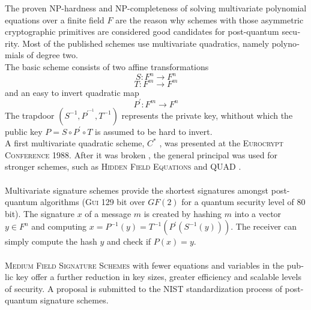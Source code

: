 \documentclass[a4paper,11pt]{article}
\begin{document}
\begin{otherlanguage}{english}
\begin{multicols}{2}
\noindent
The proven NP-hardness and NP-completeness of solving multivariate polynomial equations over a finite field $F$ are the reason why schemes with those asymmetric cryptographic primitives are considered good candidates for post-quantum security. Most of the published schemes use multivariate quadratics, namely polynomials of degree two. \\
The basic scheme consists of two affine transformations 
$$S: F^n \rightarrow F^n$$
$$T: F^m \rightarrow F^m$$
and an easy to invert quadratic map 
$$P^{\prime} : F^m \rightarrow F^n$$ 
\noindent
The trapdoor $(S^{-1}, P^{\prime^{-1}}, T^{-1})$ represents the private key, whithout which the public key $P = S \circ P^{\prime} \circ T$ is assumed to be hard to invert.\\ 
A first multivariate quadratic scheme, $C^*$ \cite{MI}, was presented at the \textsc{Eurocrypt Conference} 1988. After it was broken \cite{P95}, the general principal was used for stronger schemes, such as \textsc{Hidden Field Equations} \cite{HFE} and \textsc{QUAD} \cite{BGP}. \\
\\
Multivariate signature schemes provide the shortest signatures amongst post-quantum algorithms (\textsc{Gui} \cite{GUI} 129 bit over $GF(2)$ for a quantum security level of 80 bit). The signature $x$ of a message $m$ is created by hashing $m$ into a vector $y \in F^n$ and computing $x = P^{-1}(y) = T^{-1} (P^{\prime}(S^{-1}(y)))$. The receiver can simply compute the hash $y$ and check if $P(x) = y$. \\
\\
\textsc{Medium Field Signature Schemes} \cite{HMFE} with fewer equations and variables in the public key offer  a further reduction in key sizes, greater efficiency and scalable levels of security. A proposal is submitted to the NIST standardization process of post-quantum signature schemes.


\end{multicols}
\end{otherlanguage}
\end{document}
